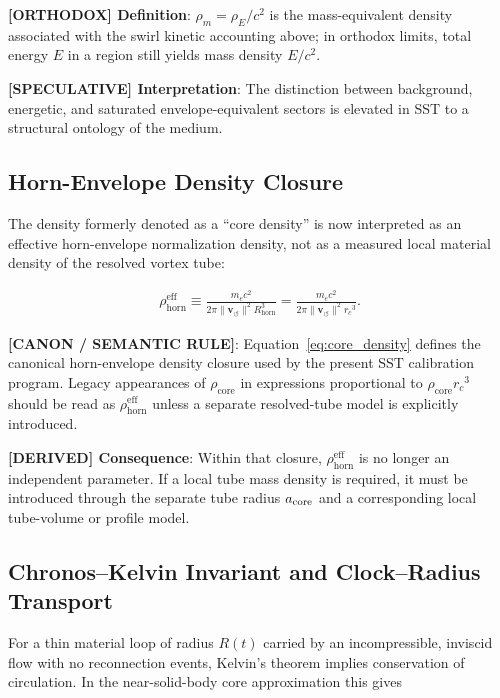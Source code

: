\documentclass[11pt]{article}
\theoremstyle{definition}
\theoremstyle{plain}
\theoremstyle{remark}
\newcommand{\rhoE}{\rho_{\!E}}
\newcommand{\rhoM}{\rho_{\!m}}
\newcommand{\rhocore}{\rho_{\mathrm{core}}}
\newcommand{\rhohorn}{\rho_{\mathrm{horn}}^{\mathrm{eff}}}
\newcommand{\rc}{{r_c}}
\newcommand{\vnorm}{\lVert \mathbf{v}_{\!\boldsymbol{\circlearrowleft}} \rVert}
\begin{document}
        \textbf{[ORTHODOX] Definition}: $\rhoM=\rhoE/c^2$ is the mass-equivalent density associated with the swirl kinetic accounting above; in orthodox limits, total energy $E$ in a region still yields mass density $E/c^2$.

        \textbf{[SPECULATIVE] Interpretation}: The distinction between background, energetic, and saturated envelope-equivalent sectors is elevated in SST to a structural ontology of the medium.
    
    \subsection{Horn-Envelope Density Closure}
        
        The density formerly denoted as a ``core density'' is now interpreted as an
        effective horn-envelope normalization density, not as a measured local
        material density of the resolved vortex tube:
        
        \begin{align}
            \rhohorn
            \equiv
            \frac{m_e c^2}{2\pi \vnorm^2 R_{\mathrm{horn}}^3}
            =
            \frac{m_e c^2}{2\pi \vnorm^2 \rc^3}.
            \label{eq:core_density}
        \end{align}
        
        \textbf{[CANON / SEMANTIC RULE]}: Equation~\eqref{eq:core_density}
        defines the canonical horn-envelope density closure used by the present
        SST calibration program. Legacy appearances of $\rhocore$ in expressions
        proportional to $\rhocore\rc^3$ should be read as $\rhohorn$ unless a
        separate resolved-tube model is explicitly introduced.

        \textbf{[DERIVED] Consequence}: Within that closure, $\rhohorn$ is no
        longer an independent parameter. If a local tube mass density is required,
        it must be introduced through the separate tube radius $a_{\rm core}$ and
        a corresponding local tube-volume or profile model.


    \subsection{Chronos--Kelvin Invariant and Clock--Radius Transport}
        \label{subsec:chronos_kelvin}

        For a thin material loop of radius $R(t)$ carried by an incompressible, inviscid flow with no reconnection events, Kelvin's theorem implies conservation of circulation. In the near-solid-body core approximation this gives
\end{document}
